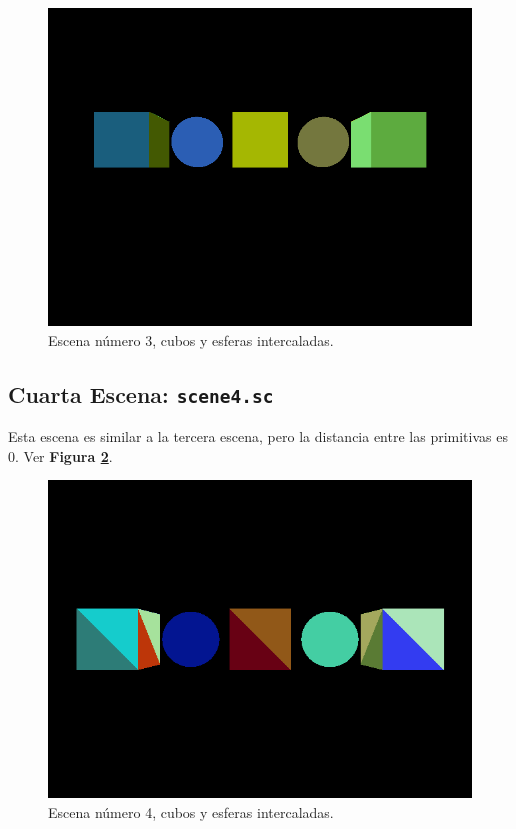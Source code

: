 \documentclass[a4paper,10pt]{article}
\begin{document}
\begin{figure}[h]
 \centering
 \includegraphics[width=320pt,keepaspectratio=true]{../scene3.png}
 \caption{Escena n\'umero 3, cubos y esferas intercaladas.}
 \label{fig:3}
\end{figure}

\subsection{Cuarta Escena: \texttt{scene4.sc}}
Esta escena es similar a la tercera escena, pero la distancia entre las primitivas es 0.  Ver \textbf{Figura \ref{fig:4}}.

\begin{figure}[h]
 \centering
 \includegraphics[width=320pt,keepaspectratio=true]{../scene4.png}
 \caption{Escena n\'umero 4, cubos y esferas intercaladas.}
 \label{fig:4}
\end{figure}
\end{document}
